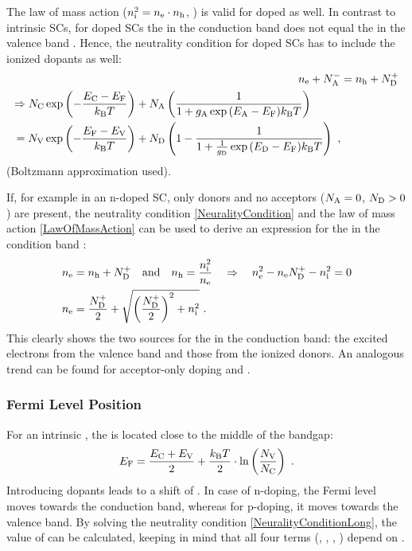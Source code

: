 The law of mass action ($n_\text{i}^2 = n_\text{e} \cdot n_\text{h}$, ) is valid for doped \SCs as well. In contrast to intrinsic SCs, for doped SCs the \neLong in the conduction band \ne does not equal the \nhLong in the valence band \nh. Hence, the neutrality condition for doped SCs has to include the ionized dopants as well:
\begin{align}
\ne + \Nai &= \nh + \Ndi
\label{eq:NeuralityCondition} \\
\begin{split}
\Rightarrow
\Nc\exp{-\frac{\Ec-\Ef}{\kT}}
%
&+
%
\Na
\left(
\frac
{1}
{1 + \ga \exp{\Ea-\Ef}{\kT}} \right)
\\
=
%
\Nv\exp{-\frac{\Ef-\Ev}{\kT}}
&+
%
\Nd \left(
1-
\frac
{1}
{1 + \frac{1}{\gd} \exp{\Ed-\Ef}{\kT}}
\right)
\label{eq:NeuralityConditionLong}
\KOMMA
\end{split}
\end{align}
(Boltzmann approximation used).

If, for example in an n-doped SC, only donors and no acceptors ($N_\text{A}=0$, $N_\text{D}>0$) are present, the neutrality condition \eqref{NeuralityCondition} and the law of mass action \eqref{LawOfMassAction} can be used to derive an expression for the \neLong in the condition band \ne\cite{Thuselt}:
\begin{align}
 n_\text{e} &= n_\text{h} + N_\text{D}^+ \quad \text{and} \quad n_\text{h} = \frac{n_\text{i}^2}{n_\text{e}} \quad \Rightarrow \quad n_\text{e}^2 - n_\text{e} N_\text{D}^+-n_\text{i}^2 = 0 \nonumber \\
 n_\text{e} &=\frac{N_\text{D}^+}{2} + \sqrt{\left(\frac{N_\text{D}^+}{2}\right)^2 + n_\text{i}^2}
~.
\end{align}
This clearly shows the two sources for the \neLong in the conduction band: the excited electrons from the valence band and those from the ionized donors. An analogous trend can be found for acceptor-only doping and \nh.

\subsubsection{Fermi Level Position}\label{sec:FermiLevelPosition}\label{sec:TheoDegenerateDoping}
For an intrinsic \SC, the \EfLong \Ef is located close to the middle of the bandgap:
\begin{equation}
 E_\text{F} = \frac{E_\text{C}+E_\text{V}}{2} + \frac{k_\text{B}T}{2}\cdot \ln \left(\frac{N_\text{V}}{N_\text{C}}\right)
~.
\label{eq:EfPosIntrinsic}
\end{equation}
Introducing dopants leads to a shift of \Ef. In case of n-doping, the Fermi level moves towards the conduction band, whereas for p-doping, it moves towards the valence band.
By solving the neutrality condition \eqref{NeuralityConditionLong}, the value of \Ef can be calculated, keeping in mind that all four terms (\ne, \nh, \Ndi, \Nai) depend on \Ef.

